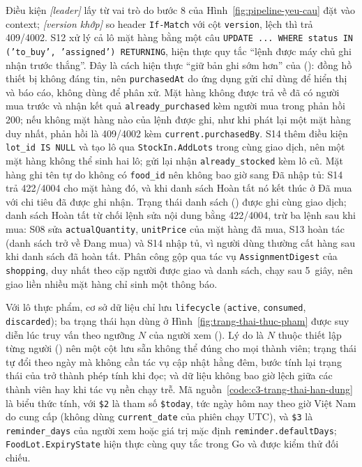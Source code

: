 Điều kiện \textit{[leader]} lấy từ vai trò do bước 8 của Hình~\ref{fig:pipeline-yeu-cau} đặt vào context; \textit{[version khớp]} so header \texttt{If-Match} với cột \texttt{version}, lệch thì trả 409/4002. S12 xử lý cả lô mặt hàng bằng một câu \texttt{UPDATE ... WHERE status IN ('to\_buy', 'assigned') RETURNING}, hiện thực quy tắc “lệnh được máy chủ ghi nhận trước thắng”. Đây là cách hiện thực “giữ bản ghi sớm hơn” của  (): đồng hồ thiết bị không đáng tin, nên \texttt{purchasedAt} do ứng dụng gửi chỉ dùng để hiển thị và báo cáo, không dùng để phân xử. Mặt hàng không được trả về đã có người mua trước và nhận kết quả \texttt{already\_purchased} kèm người mua trong phản hồi 200; nếu không mặt hàng nào của lệnh được ghi, như khi phát lại một mặt hàng duy nhất, phản hồi là 409/4002 kèm \texttt{current.purchasedBy}. S14 thêm điều kiện \texttt{lot\_id IS NULL} và tạo lô qua \texttt{StockIn.AddLots} trong cùng giao dịch, nên một mặt hàng không thể sinh hai lô; gửi lại nhận \texttt{already\_stocked} kèm lô cũ. Mặt hàng ghi tên tự do không có \texttt{food\_id} nên không bao giờ sang Đã nhập tủ: S14 trả 422/4004 cho mặt hàng đó, và khi danh sách Hoàn tất nó kết thúc ở Đã mua với chi tiêu đã được ghi nhận. Trạng thái danh sách () được ghi cùng giao dịch; danh sách Hoàn tất từ chối lệnh sửa nội dung bằng 422/4004, trừ ba lệnh sau khi mua: S08 sửa \texttt{actualQuantity}, \texttt{unitPrice} của mặt hàng đã mua, S13 hoàn tác (danh sách trở về Đang mua) và S14 nhập tủ, vì người dùng thường cất hàng sau khi danh sách đã hoàn tất. Phân công gộp qua tác vụ \texttt{AssignmentDigest} của \texttt{shopping}, duy nhất theo cặp người được giao và danh sách, chạy sau 5~giây, nên giao liền nhiều mặt hàng chỉ sinh một thông báo.

Với lô thực phẩm, cơ sở dữ liệu chỉ lưu \texttt{lifecycle} (\texttt{active}, \texttt{consumed}, \texttt{discarded}); ba trạng thái hạn dùng ở Hình~\ref{fig:trang-thai-thuc-pham} được suy diễn lúc truy vấn theo ngưỡng $N$ của người xem (). Lý do là $N$ thuộc thiết lập từng người () nên một cột lưu sẵn không thể đúng cho mọi thành viên; trạng thái tự đổi theo ngày mà không cần tác vụ cập nhật hằng đêm, bước tính lại trạng thái của  trở thành phép tính khi đọc; và dữ liệu không bao giờ lệch giữa các thành viên hay khi tác vụ nền chạy trễ. Mã nguồn~\ref{code:c3-trang-thai-han-dung} là biểu thức tính, với \texttt{\$2} là tham số \texttt{\$today}, tức ngày hôm nay theo giờ Việt Nam do  cung cấp (không dùng \texttt{current\_date} của phiên chạy UTC), và \texttt{\$3} là \texttt{reminder\_days} của người xem hoặc giá trị mặc định \texttt{reminder.defaultDays}; \texttt{FoodLot.ExpiryState} hiện thực cùng quy tắc trong Go và được kiểm thử đối chiếu.

